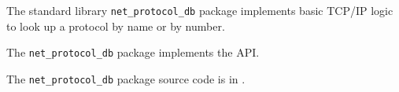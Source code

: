 
The standard library {\tt net\_protocol\_db} package implements basic {\sc TCP/IP} logic to 
look up a protocol by name or by number.

The {\tt {\tt net\_protocol\_db}} package implements the  API.

The {\tt {\tt net\_protocol\_db}} package source code is in .

